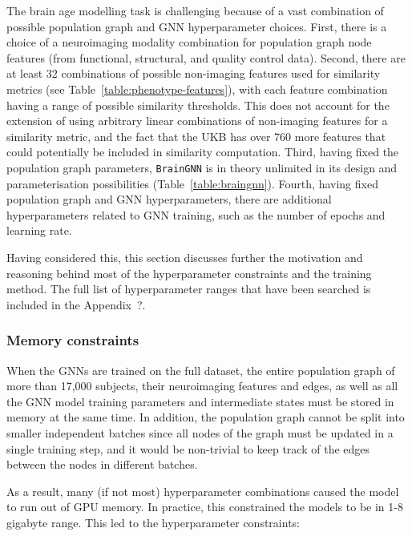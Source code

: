 The brain age modelling task is challenging because of a vast combination of possible population graph and GNN hyperparameter choices. First, there is a choice of a neuroimaging modality combination for population graph node features (from functional, structural, and quality control data). Second, there are at least 32 combinations of possible non-imaging features used for similarity metrics (see Table~\ref{table:phenotype-features}), with each feature combination having a range of possible similarity thresholds. This does not account for the extension of using arbitrary linear combinations of non-imaging features for a similarity metric, and the fact that the UKB has over 760 more features that could potentially be included in similarity computation. Third, having fixed the population graph parameters, \texttt{BrainGNN} is in theory unlimited in its design and parameterisation possibilities (Table~\ref{table:braingnn}). Fourth, having fixed population graph and GNN hyperparameters, there are additional hyperparameters related to GNN training, such as the number of epochs and learning rate.

Having considered this, this section discusses further the motivation and reasoning behind most of the hyperparameter constraints and the training method. The full list of hyperparameter ranges that have been searched is included in the Appendix~?. 

\subsubsection{Memory constraints}
\label{section:memory}
When the GNNs are trained on the full dataset, the entire population graph of more than 17,000 subjects, their neuroimaging features and edges, as well as all the GNN model training parameters and intermediate states must be stored in memory at the same time. In addition, the population graph cannot be split into smaller independent batches since all nodes of the graph must be updated in a single training step, and it would be non-trivial to keep track of the edges between the nodes in different batches.

As a result, many (if not most) hyperparameter combinations caused the model to run out of GPU memory. In practice, this constrained the models to be in 1-8 gigabyte range. This led to the hyperparameter constraints:

